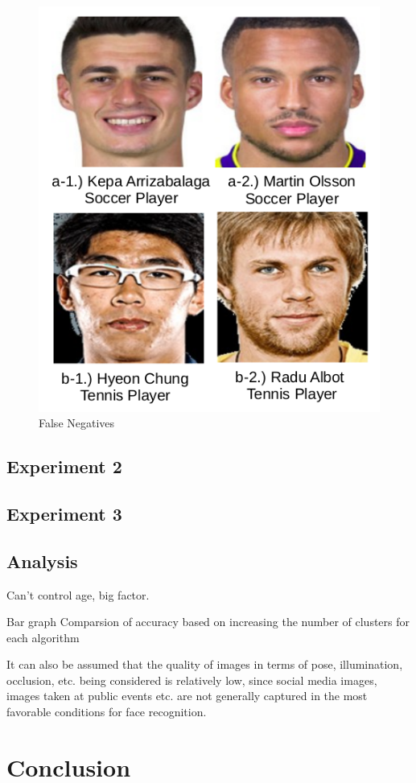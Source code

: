 \documentclass[12pt,english]{article}
\begin{document}
\begin{figure}[!tbp]
 \centering
    \includegraphics[width=0.4\columnwidth]{figures/soccer_fn.png}
    \caption{False Negatives}
    \label{fig:ex1fn}
\end{figure}

\subsection{Experiment 2}

\subsection{Experiment 3}


\subsection{Analysis}

Can't control age, big factor.

Bar graph Comparsion of accuracy based on increasing the number of clusters for each algorithm


It can also be assumed that the quality of images in terms of pose, illumination, occlusion, etc. being considered is relatively low, since social media images, images taken at public events etc. are not generally captured in the most favorable conditions for face recognition. \cite{shi}

\section{Conclusion}
\end{document}
